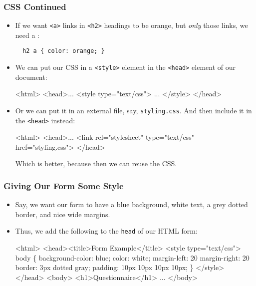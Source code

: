 \documentclass[dvipsnames,handout]{beamer}
\begin{document}
\begin{frame}[fragile=singleslide]
  \frametitle{CSS Continued}

  \begin{itemize}
  \item If we want \texttt{<a>} links in \texttt{<h2>} headings to be
    orange, but \emph{only} those links, we need a :
    \begin{small}
\begin{verbatim}
  h2 a { color: orange; }
\end{verbatim}
    \end{small}

  \item We can put our CSS in a \texttt{<style>} element in the
    \texttt{<head>} element of our document:
    \begin{footnotesize}\color{gray}
\begin{semiverbatim}
  <html>
  <head>...
    {\color{black}<style type="text/css">
      ...
    </style>}
  </head>
\end{semiverbatim}
    \end{footnotesize}
  \item Or we can put it in an external file, say,
    \texttt{styling.css}.  And then include it in the \texttt{<head>}
    instead:
    \begin{footnotesize}\color{gray}
\begin{semiverbatim}
  <html>
  <head>...
    {\color{black}<link rel="stylesheet" type="text/css" href="styling.css">}
  </head>
\end{semiverbatim}
    \end{footnotesize}
    Which is better, because then we can reuse the CSS.
  \end{itemize}
\end{frame}



\begin{frame}[fragile]
  \frametitle{Giving Our Form Some Style}
  
  \begin{itemize}
  \item Say, we want our form to have a blue background, white text, a
    grey dotted border, and nice wide margins.

  \item Thus, we add the following  to the
    \texttt{head} of our HTML form:
    \begin{footnotesize}\color{gray}
\begin{semiverbatim}
<html>
<head><title>Form Example</title>
{\color{black}<style type="text/css">
  body \{ background-color: blue;
         color: white;
         margin-left: 20%
         margin-right: 20%
         border: 3px dotted gray;
         padding: 10px 10px 10px 10px;
  \}
</style>}
</head>
<body>
<h1>Questionnaire</h1>
...
</body>
\end{semiverbatim}
    \end{footnotesize}
  \end{itemize}
\end{frame}
\end{document}
